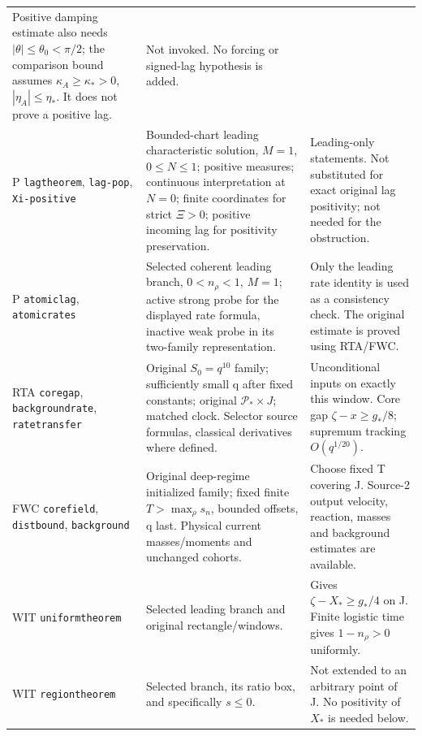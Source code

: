 \documentclass[11pt]{article}
\begin{document}
\begin{longtable}{>{\raggedright\arraybackslash}p{}
 >{\raggedright\arraybackslash}p{}
 >{\raggedright\arraybackslash}p{}}
 Positive damping estimate also needs \(|\theta|\le\theta_0<\pi/2\);
 the comparison bound assumes \(\kappa_A\ge\kappa_*>0\),
 \(|\eta_A|\le\eta_*\). It does not prove a positive lag.
& Not invoked. No forcing or signed-lag hypothesis is added.\\
P \texttt{lagtheorem}, \texttt{lag-pop}, \texttt{Xi-positive}
& Bounded-chart leading characteristic solution, \(M=1\),
 \(0\le N\le1\); positive measures; continuous interpretation at
 \(N=0\); finite coordinates for strict \(\Xi>0\); positive incoming
 lag for positivity preservation.
& Leading-only statements. Not substituted for exact original
 lag positivity; not needed for the obstruction.\\
P \texttt{atomiclag}, \texttt{atomicrates}
& Selected coherent leading branch, \(0<n_\rho<1\), \(M=1\);
 active strong probe for the displayed rate formula, inactive weak
 probe in its two-family representation.
& Only the leading rate identity is used as a consistency check.
 The original estimate is proved using RTA/FWC.\\
RTA \texttt{coregap}, \texttt{backgroundrate}, \texttt{ratetransfer}
& Original \(S_0=q^{10}\) family; sufficiently small q after
 fixed constants; original \(\mathcal P_*\times J\); matched clock.
 Selector source formulas, classical derivatives where defined.
& Unconditional inputs on exactly this window. Core gap
 \(\zeta-x\ge g_*/8\); supremum tracking \(O(q^{1/20})\).\\
FWC \texttt{corefield}, \texttt{distbound}, \texttt{background}
& Original deep-regime initialized family; fixed finite
 \(T>\max_\rho s_n\), bounded offsets, q last.
 Physical current masses/moments and unchanged cohorts.
& Choose fixed T covering J. Source-2 output velocity,
 reaction, masses and background estimates are available.\\
WIT \texttt{uniformtheorem}
& Selected leading branch and original rectangle/windows.
& Gives \(\zeta-X_*\ge g_*/4\) on J.
 Finite logistic time gives \(1-n_\rho>0\) uniformly.\\
WIT \texttt{regiontheorem}
& Selected branch, its ratio box, and specifically \(s\le0\).
& Not extended to an arbitrary point of J. No positivity of
 \(X_*\) is needed below.\\
\bottomrule
\end{longtable}\normalsize
\end{document}
